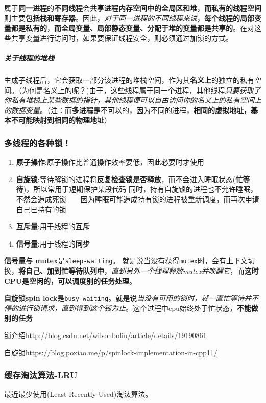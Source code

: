 \documentclass[UTF8,a4paper,8pt]{ctexart}
\begin{document}
			属于\textbf{同一进程}的\textbf{不同线程}会\textbf{共享进程内存空间中的全局区和堆}，\textbf{而私有的线程空间}则主要\textbf{包括栈和寄存器}。因此，\textit{对于同一进程的不同线程来说}，\textbf{每个线程的局部变量都是私有的}，\textbf{而全局变量、局部静态变量、分配于堆的变量都是共享的}。在对这些共享变量进行访问时，如果要保证线程安全，则必须通过加锁的方式。
			
			
			\subparagraph{关于线程的堆栈}
			生成子线程后，它会获取一部分该进程的堆栈空间，作为其\textbf{名义上}的独立的私有空间。（为何是名义上的呢？)由于，这些线程属于同一个进程，其他线程\textit{只要获取了你私有堆栈上某些数据的指针，其他线程便可以自由访问你的名义上的私有空间上的数据变量}。（注：而\textbf{多进程}是不可以的，因为不同的进程，\textbf{相同的虚拟地址，基本不可能映射到相同的物理地址}）
			
		\subsubsection{多线程的各种锁！}
			\begin{enumerate}
				\item \textbf{原子操作}:原子操作比普通操作效率要低，因此必要时才使用
				\item \textbf{自旋锁}:等待解锁的进程将\textbf{反复检查锁是否释放}，而不会进入睡眠状态(\textbf{忙等待})，所以常用于短期保护某段代码
				同时，持有自旋锁的进程也不允许睡眠，不然会造成死锁——因为睡眠可能造成持有锁的进程被重新调度，而再次申请自己已持有的锁
				\item \textbf{互斥量}:用于线程的\textbf{互斥}
				\item \textbf{信号量}:用于线程的\textbf{同步}
			\end{enumerate}
			
			\textbf{信号量与 mutex}是\verb|sleep-waiting|。 就是说当没有获得\verb|mutex|时，会有上下文切换，\textbf{将自己、加到忙等待队列中}，\textit{直到另外一个线程释放mutex并唤醒它}，而\textbf{这时CPU是空闲的，可以调度别的任务处理}。
			
			\textbf{自旋锁spin lock}是\verb|busy-waiting|。就是说\textit{当没有可用的锁时，就一直忙等待并不停的进行锁请求，直到得到这个锁为止}。这个过程中cpu始终处于忙状态，\textbf{不能做别的任务}
			
			
			锁介绍\url{http://blog.csdn.net/wilsonboliu/article/details/19190861}
			
			自旋锁\url{https://blog.poxiao.me/p/spinlock-implementation-in-cpp11/}
		\subsubsection{缓存淘汰算法-LRU}
			最近最少使用(Least Recently Used)淘汰算法。
			
\end{document}
